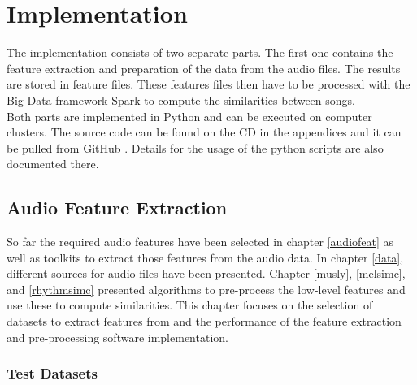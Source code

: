 
\chapter{Implementation}

The implementation consists of two separate parts. The first one contains the feature extraction and preparation of the data from the audio files. The results are stored in feature files. These features files then have to be processed with the Big Data framework Spark to compute the similarities between songs.\\ 
Both parts are implemented in Python and can be executed on computer clusters. The source code can be found on the CD in the appendices and it can be pulled from GitHub \cite{github-code}. Details for the usage of the python scripts are also documented there.

\section{Audio Feature Extraction}\label{simmet}

So far the required audio features have been selected in chapter \ref{audiofeat} as well as toolkits to extract those features from the audio data.
In chapter \ref{data}, different sources for audio files have been presented. Chapter \ref{musly}, \ref{melsimc}, and \ref{rhythmsimc} presented algorithms to pre-process the low-level features and use these to compute similarities. 
This chapter focuses on the selection of datasets to extract features from and the performance of the feature extraction and pre-processing software implementation.  

\subsection{Test Datasets}

